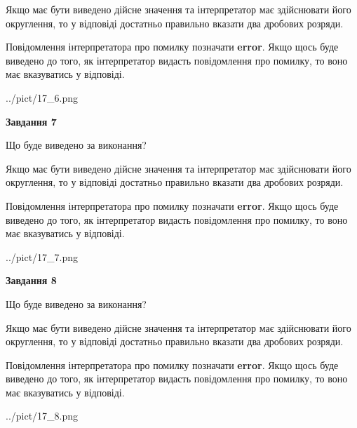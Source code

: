 \documentclass[12pt, ukrainian]{article}
\begin{document}
{\begin {Large}
Якщо має бути виведено дійсне значення та інтерпретатор має здійснювати його округлення, 
то у відповіді достатньо правильно вказати два дробових розряди.

Повідомлення інтерпретатора про помилку позначати \textbf{error}.
Якщо щось буде виведено до того, як інтерпретатор видасть повідомлення про помилку, 
то воно має вказуватись у відповіді. \par

\begin{center}
	{../pict/17_6.png}
\end{center}
\newpage

{\begin {center}\textbf{Завдання 7}\end {center}}\par
Що буде виведено за виконання? \par

Якщо має бути виведено дійсне значення та інтерпретатор має здійснювати його округлення, 
то у відповіді достатньо правильно вказати два дробових розряди.

Повідомлення інтерпретатора про помилку позначати \textbf{error}.
Якщо щось буде виведено до того, як інтерпретатор видасть повідомлення про помилку, 
то воно має вказуватись у відповіді. \par

\begin{center}
	{../pict/17_7.png}
\end{center}
\newpage

{\begin {center}\textbf{Завдання 8}\end {center}}\par
Що буде виведено за виконання? \par

Якщо має бути виведено дійсне значення та інтерпретатор має здійснювати його округлення, 
то у відповіді достатньо правильно вказати два дробових розряди.

Повідомлення інтерпретатора про помилку позначати \textbf{error}.
Якщо щось буде виведено до того, як інтерпретатор видасть повідомлення про помилку, 
то воно має вказуватись у відповіді. \par

\begin{center}
	{../pict/17_8.png}
\end{center}
\newpage


\end{Large}}
\end{document}
